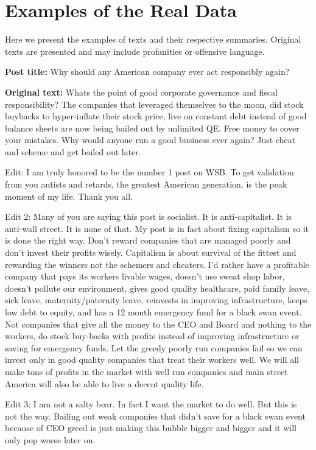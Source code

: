 \chapter{Examples of the Real Data}\label{app:A}
Here we present the examples of texts and their respective summaries. Original texts are presented and may include profanities or offensive language.

\textbf{Post title:} Why should any American company ever act responsibly again?

\textbf{Original text:} Whats the point of good corporate governance and fiscal responsibility? The companies that leveraged themselves to the moon, did stock buybacks to hyper-inflate their stock price, live on constant debt instead of good balance sheets are now being bailed out by unlimited QE. Free money to cover your mistakes. Why would anyone run a good business ever again? Just cheat and scheme and get bailed out later.

Edit: I am truly honored to be the number 1 post on WSB. To get validation from you autists and retards, the greatest American generation, is the peak moment of my life. Thank you all.

Edit 2: Many of you are saying this post is socialist. It is anti-capitalist. It is anti-wall street. It is none of that. My post is in fact about fixing capitalism so it is done the right way. Don’t reward companies that are managed poorly and don’t invest their profits wisely. Capitalism is about survival of the fittest and rewarding the winners not the schemers and cheaters. I’d rather have a profitable company that pays its workers livable wages, doesn’t use sweat shop labor, doesn’t pollute our environment, gives good quality healthcare, paid family leave, sick leave, maternity/paternity leave, reinvests in improving infrastructure, keeps low debt to equity, and has a 12 month emergency fund for a black swan event. Not companies that give all the money to the CEO and Board and nothing to the workers, do stock buy-backs with profits instead of improving infrastructure or saving for emergency funds. Let the greedy poorly run companies fail so we can invest only in good quality companies that treat their workers well. We will all make tons of profits in the market with well run companies and main street America will also be able to live a decent quality life.

Edit 3: I am not a salty bear. In fact I want the market to do well. But this is not the way. Bailing out weak companies that didn’t save for a black swan event because of CEO greed is just making this bubble bigger and bigger and it will only pop worse later on.


